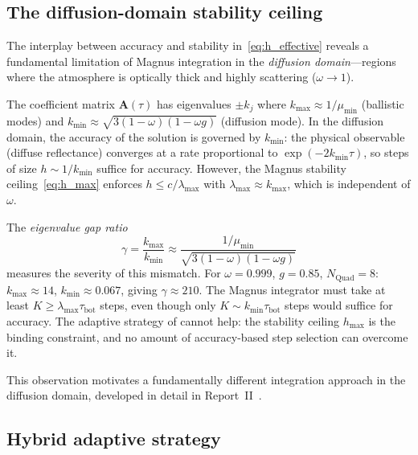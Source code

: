 \documentclass[11pt,a4paper]{article}
\newcommand{\mat}[1]{\mathbf{#1}}
\theoremstyle{definition}
\begin{document}
\subsection{The diffusion-domain stability ceiling}
\label{sec:diffusion_ceiling}

The interplay between accuracy and stability
in~\eqref{eq:h_effective} reveals a fundamental limitation of Magnus
integration in the \emph{diffusion domain}---regions where the
atmosphere is optically thick and highly scattering ($\omega\to 1$).

The coefficient matrix $\mat{A}(\tau)$ has eigenvalues $\pm k_j$ where
$k_{\max}\approx 1/\mu_{\min}$ (ballistic modes) and
$k_{\min}\approx\sqrt{3(1-\omega)(1-\omega g)}$ (diffusion mode).  In
the diffusion domain, the accuracy of the solution is governed by
$k_{\min}$: the physical observable (diffuse reflectance) converges at a
rate proportional to $\exp(-2k_{\min}\tau)$, so steps of size
$h\sim 1/k_{\min}$ suffice for accuracy.  However, the Magnus stability
ceiling~\eqref{eq:h_max} enforces $h\leq c/\lambda_{\max}$ with
$\lambda_{\max}\approx k_{\max}$, which is independent of $\omega$.

The \emph{eigenvalue gap ratio}
\begin{equation}\label{eq:gap_ratio}
  \gamma = \frac{k_{\max}}{k_{\min}}
  \approx \frac{1/\mu_{\min}}{\sqrt{3(1-\omega)(1-\omega g)}}
\end{equation}
measures the severity of this mismatch.  For $\omega=0.999$, $g=0.85$,
$N_{\text{Quad}}=8$: $k_{\max}\approx 14$, $k_{\min}\approx 0.067$,
giving $\gamma\approx 210$.  The Magnus integrator must take at least
$K\geq\lambda_{\max}\tau_{\text{bot}}$ steps, even though only
$K\sim k_{\min}\tau_{\text{bot}}$ steps would suffice for accuracy.  The
adaptive strategy of  cannot help: the stability
ceiling $h_{\max}$ is the binding constraint, and no amount of
accuracy-based step selection can overcome it.

This observation motivates a fundamentally different integration
approach in the diffusion domain, developed in detail in
Report~II~\cite{report2}.

\subsection{Hybrid adaptive strategy}\label{sec:hybrid_adaptive}
\end{document}
